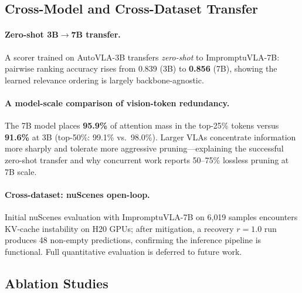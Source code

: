 \documentclass[letterpaper]{article} %
\begin{document}
\subsection{Cross-Model and Cross-Dataset Transfer}
\label{sec:gen}

\paragraph{Zero-shot 3B$\to$7B transfer.}
A scorer trained on AutoVLA-3B transfers \emph{zero-shot} to ImpromptuVLA-7B:
pairwise ranking accuracy rises from 0.839 (3B) to \textbf{0.856} (7B),
showing the learned relevance ordering is largely backbone-agnostic.

\paragraph{A model-scale comparison of vision-token redundancy.}
The 7B model places \textbf{95.9\%} of attention mass in the top-25\% tokens
versus \textbf{91.6\%} at 3B (top-50\%: 99.1\% vs.\ 98.0\%).
Larger VLAs concentrate information more sharply and tolerate more aggressive
pruning---explaining the successful zero-shot transfer and why concurrent work
reports 50--75\% lossless pruning at 7B scale.

\paragraph{Cross-dataset: nuScenes open-loop.}
Initial nuScenes evaluation with ImpromptuVLA-7B on 6{,}019 samples encounters
KV-cache instability on H20 GPUs; after mitigation, a recovery $r{=}1.0$ run
produces 48 non-empty predictions, confirming the inference pipeline is
functional. Full quantitative evaluation is deferred to future work.

\subsection{Ablation Studies}
\label{sec:ablation}
\end{document}
